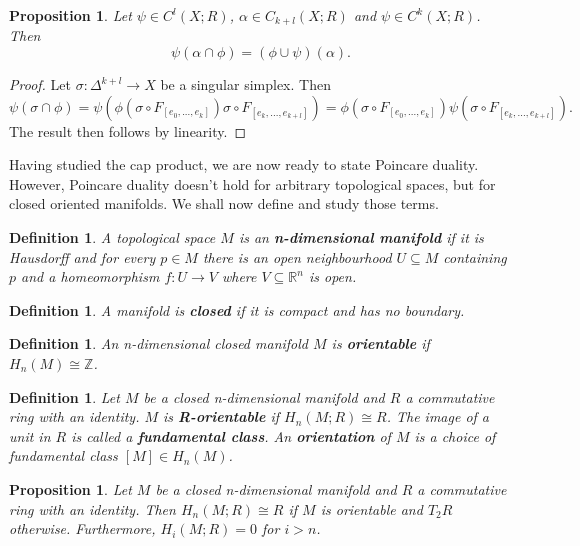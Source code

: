 \documentclass{article}
\newtheorem{definition}[theorem]{Definition}
\newtheorem{proposition}[theorem]{Proposition}
\begin{document}
\begin{proposition}
Let $\psi\in C^l(X;R)$, $\alpha\in C_{k+l}(X;R)$ and $\psi\in C^k(X;R)$. Then \[\psi(\alpha\cap\phi)=(\phi\cup\psi)(\alpha).\]
\end{proposition}
\begin{proof}
Let $\sigma\colon\Delta^{k+l}\to X$ be a singular simplex. Then \[\psi(\sigma\cap\phi)=\psi(\phi(\sigma\circ F_{[e_0,...,e_k]})\sigma\circ F_{[e_k,...,e_{k+l}]})=\phi(\sigma\circ F_{[e_0,...,e_k]})\psi(\sigma\circ F_{[e_k,...,e_{k+l}]}).\]
The result then follows by linearity.
\end{proof}

Having studied the cap product, we are now ready to state Poincare duality. However, Poincare duality doesn't hold for arbitrary topological spaces, but for closed oriented manifolds. We shall now define and study those terms.

\begin{definition}
A topological space $M$ is an \textbf{n-dimensional manifold} if it is Hausdorff and for every $p\in M$ there is an open neighbourhood $U\subseteq M$ containing $p$ and a homeomorphism $f\colon U\to V$ where $V\subseteq\mathbb{R}^n$ is open.
\end{definition}

\begin{definition}
A manifold is \textbf{closed} if it is compact and has no boundary.
\end{definition}

\begin{definition}
An n-dimensional closed manifold $M$ is \textbf{orientable} if $H_n(M)\cong \mathbb{Z}$.
\end{definition}

\begin{definition}
Let $M$ be a closed n-dimensional manifold and $R$ a commutative ring with an identity. $M$ is \textbf{R-orientable} if $H_n(M;R)\cong R$. The image of a unit in $R$ is called a \textbf{fundamental class}. An \textbf{orientation} of $M$ is a choice of fundamental class $[M]\in H_n(M)$.
\end{definition}

\begin{proposition}
Let $M$ be a closed n-dimensional manifold and $R$ a commutative ring with an identity. Then $H_n(M;R)\cong R$ if $M$ is orientable and $T_2R$ otherwise. Furthermore, $H_i(M;R)=0$ for $i>n$.
\end{proposition}
\end{document}
